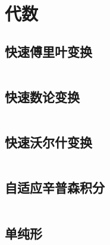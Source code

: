 \section{代数}
\subsection{快速傅里叶变换}
\inputminted{cpp}{\source/algebra/fast-fourier-transform.cpp}
\subsection{快速数论变换}
\inputminted{cpp}{\source/algebra/fast-numerical-transform.cpp}
\subsection{快速沃尔什变换}
\inputminted{cpp}{\source/algebra/FWT.cpp}
\subsection{自适应辛普森积分}
\inputminted{cpp}{\source/algebra/adaptive-simpsons-method.cpp}
\subsection{单纯形}
\inputminted{cpp}{\source/algebra/simplex.cpp}
